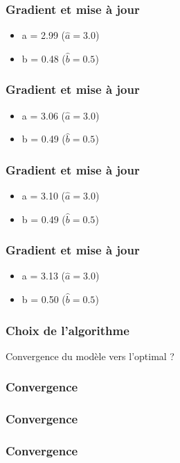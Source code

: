 \documentclass{formation}
\begin{document}
\begin{frame}
  \frametitle{Gradient et mise à jour}
  \begin{itemize}
  \item a = 2.99 ($\hat{a} = 3.0$)
  \item b = 0.48 ($\hat{b} = 0.5$)
  \end{itemize}
\end{frame}

\begin{frame}
  \frametitle{Gradient et mise à jour}
  \begin{itemize}
  \item a = 3.06 ($\hat{a} = 3.0$)
  \item b = 0.49 ($\hat{b} = 0.5$)
  \end{itemize}
\end{frame}

\begin{frame}
  \frametitle{Gradient et mise à jour}
  \begin{itemize}
  \item a = 3.10 ($\hat{a} = 3.0$)
  \item b = 0.49 ($\hat{b} = 0.5$)
  \end{itemize}
\end{frame}

\begin{frame}
  \frametitle{Gradient et mise à jour}
  \begin{itemize}
  \item a = 3.13 ($\hat{a} = 3.0$)
  \item b = 0.50 ($\hat{b} = 0.5$)
  \end{itemize}
\end{frame}

\begin{frame}
  \frametitle{Choix de l'algorithme}
  Convergence du modèle vers l'optimal ?
\end{frame}

\begin{frame}
  \frametitle{Convergence}
\end{frame}

\begin{frame}
  \frametitle{Convergence}
\end{frame}

\begin{frame}
  \frametitle{Convergence}
\end{frame}
\end{document}
